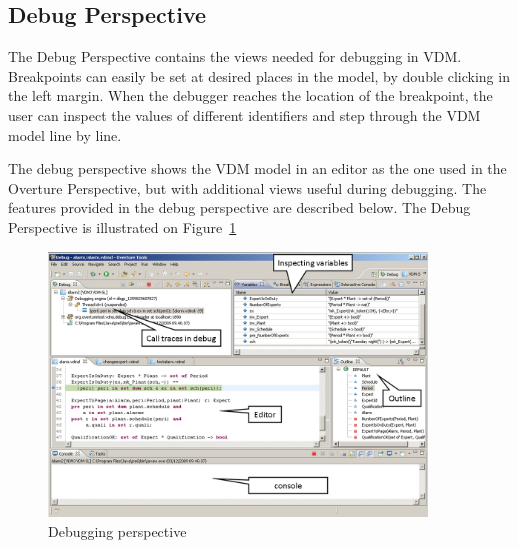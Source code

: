 \documentclass{overturerep}
\begin{document}
{\subsection{Debug Perspective}

The Debug Perspective contains the views
needed for debugging in VDM. Breakpoints can easily be set at desired
places in the model, by double clicking in the left margin. When the
debugger reaches the location of the breakpoint, the user can inspect
the values of different identifiers and step through the VDM model
line by line.
 
The debug perspective shows the VDM model in an editor as the one used in the
Overture Perspective, but with additional views useful during
debugging. The features provided in the debug perspective are described below.
The Debug Perspective is illustrated on Figure~\ref{fig:userguide:DebuggingVDM}

\begin{figure}[htp]
\begin{center}
  \includegraphics[width=380px]{figures/DebuggingVDM}
  \caption[Debugging perspective]{Debugging perspective}
  \label{fig:userguide:DebuggingVDM}
\end{center}
\end{figure}


}
\end{document}
